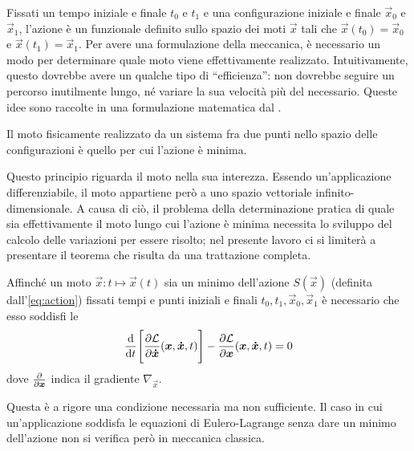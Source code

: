 Fissati un tempo iniziale e finale $t_0$ e $t_1$ e una configurazione iniziale e finale $\vec{x}_0$ e $\vec{x}_1$, l'azione è un funzionale definito sullo spazio dei moti $\vec{x}$ tali che $\vec{x}(t_0) = \vec{x}_0$ e $\vec{x}(t_1)=\vec{x}_1$. Per avere una formulazione della meccanica, è necessario un modo per determinare quale moto viene effettivamente realizzato. Intuitivamente, questo dovrebbe avere un qualche tipo di \textquotedblleft efficienza\textquotedblright: non dovrebbe seguire un percorso inutilmente lungo, né variare la sua velocità più del necessario. Queste idee sono raccolte in una formulazione matematica dal .
\begin{minaction}
Il moto fisicamente realizzato da un sistema fra due punti nello spazio delle configurazioni è quello per cui l'azione è minima.
\end{minaction}
Questo principio riguarda il moto nella sua interezza. Essendo un'applicazione differenziabile, il moto appartiene però a uno spazio vettoriale infinito-dimensionale. A causa di ciò, il problema della determinazione pratica di quale sia effettivamente il moto lungo cui l'azione è minima necessita lo sviluppo del calcolo delle variazioni per essere risolto; nel presente lavoro ci si limiterà a presentare il teorema che risulta da una trattazione completa.
\begin{theorem}
  Affinché un moto $\vec{x}: t\mapsto \vec{x}(t)$ sia un minimo dell'azione $S(\vec{x})$ (definita dall'\autoref{eq:action}) fissati tempi e punti iniziali e finali $t_0, t_1, \vec{x}_0, \vec{x}_1$ è necessario che esso soddisfi le  \begin{equation}
    \dv{t}\Bigg[\pdv{\mathcal{L}}{\boldsymbol{\dot{x}}}()(\boldsymbol{x}, \boldsymbol{\dot{x}}, t)\Bigg] - \pdv{\mathcal{L}}{\boldsymbol{x}}()(\boldsymbol{x}, \boldsymbol{\dot{x}}, t) = 0
  \end{equation} 
  dove $\pdv{\boldsymbol{x}}$ indica il gradiente $\nabla_{\vec{x}}$.
\end{theorem}
\begin{remark}
  Questa è a rigore una condizione necessaria ma non sufficiente. Il caso in cui un'applicazione soddisfa le equazioni di Eulero-Lagrange senza dare un minimo dell'azione non si verifica però in meccanica classica.
\end{remark}

